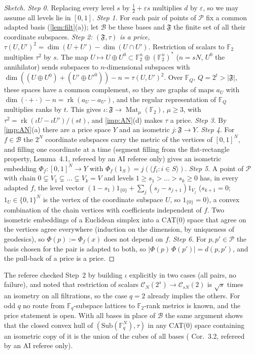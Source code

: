\documentclass[10pt]{amsart}
\theoremstyle{plain}
\theoremstyle{definition}
\theoremstyle{remark}
\numberwithin{equation}{section}
\newcommand{\F}{\mathbb{F}}
\newcommand{\cC}{\mathcal{C}}
\newcommand{\cF}{\mathfrak{F}}
\newcommand{\rk}{\operatorname{rk}}
\newcommand{\Mat}{\operatorname{Mat}}
\newcommand{\eps}{\varepsilon}
\newcommand{\dd}[2]{|#1\,#2|}
\newcommand{\stR}{refereed by an AI referee only}
\begin{document}
\begin{proof}[Sketch]
\emph{Step 0.} Replacing every level $s$ by $\tfrac12+\eps s$ multiplies $d$ by $\eps$, so we may assume
all levels lie in $[0,1]$. \emph{Step 1.} For each pair of points of $\mathcal P$ fix a common adapted
basis (\cref{lem:filt}(a)); let $\mathcal B$ be these bases and $\cF$ the finite set of all their coordinate
subspaces. \emph{Step 2: $(\cF,\tau)$ is a price, $\tau(U,U')^2=\dim(U+U')-\dim(U\cap U')$.} Restriction
of scalars to $\F_2$ multiplies $\tau^2$ by $s$. The map $U\mapsto U\oplus U^0\subset\F_2^n\oplus(\F_2^n)^*$
($n=sN$, $U^0$ the annihilator) sends subspaces to $n$-dimensional subspaces with
$\dim((U\oplus U^0)+(U'\oplus U'^0))-n=\tau(U,U')^2$. Over $\F_Q$, $Q=2^t>|\cF|$, these spaces have a
common complement, so they are graphs of maps $a_U$ with $\dim(\cdot+\cdot)-n=\rk(a_U-a_{U'})$, and
the regular representation of $\F_Q$ multiplies ranks by $t$. This gives $\iota:\cF\to\Mat_\mu(\F_2)$,
$\mu\ge3$, with $\tau^2=\rk(\iota U-\iota U')/(st)$, and \cref{imp:AN}(d) makes $\tau$ a price.
\emph{Step 3.} By \cref{imp:AN}(a) there are a price space $Y$ and an isometric $j:\cF\to Y$.
\emph{Step 4.} For $f\in\mathcal B$ the $2^N$ coordinate subspaces carry the metric of the vertices of
$[0,1]^N$, and filling one coordinate at a time (segment filling from the flat-rectangle property,
 Lemma~4.1, \stR) gives an isometric embedding $\Phi_f:[0,1]^N\to Y$ with
$\Phi_f(1_S)=j(\langle f_i:i\in S\rangle)$. \emph{Step 5.} A point of $\mathcal P$ with chain
$0\subsetneq V_1\subsetneq\dots\subsetneq V_k=V$ and levels $1\ge s_1>\dots>s_k\ge0$ has, in every adapted
$f$, the level vector $(1-s_1)1_{\{0\}}+\sum_j(s_j-s_{j+1})1_{V_j}$ ($s_{k+1}=0$; $1_U\in\{0,1\}^N$ is the vertex
of the coordinate subspace $U$, so $1_{\{0\}}=0$), a convex combination of the chain vertices with coefficients independent of $f$. Two isometric embeddings of a Euclidean simplex
into a CAT(0) space that agree on the vertices agree everywhere (induction on the dimension, by
uniqueness of geodesics), so $\Phi(p):=\Phi_f(x)$ does not depend on $f$. \emph{Step 6.} For $p,p'\in\mathcal
P$ the basis chosen for the pair is adapted to both, so $\dd{\Phi(p)}{\Phi(p')}=d(p,p')$, and the pull-back
of a price is a price.
\end{proof}

The referee checked Step~2 by building $\iota$ explicitly in two cases (all pairs, no failure), and
noted that restriction of scalars $\cC_N(2^s)\to\cC_{sN}(2)$ is $\sqrt s$ times an isometry on all
filtrations, so the case $q=2$ already implies the others. For odd $q$ no route from $\F_q$-subspace
lattices to $\F_2$-rank metrics is known, and the price statement is open. With all bases in place of
$\mathcal B$ the same argument shows that the closed convex hull of $(\mathrm{Sub}(\F_q^N),\tau)$ in any
CAT(0) space containing an isometric copy of it is the union of the cubes of all bases
( Cor.~3.2, \stR).
\end{document}
